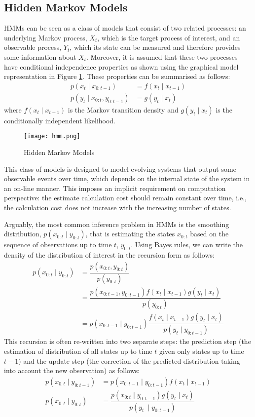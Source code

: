 \subsection{Hidden Markov Models}
HMMs can be seen as a class of models that consist of two related processes: an underlying Markov process, $X_t$, which is the target process of interest, and an observable process, $Y_t$, which its state can be measured and therefore provides some information about $X_t$. Moreover, it is assumed that these two processes have conditional independence properties as shown using the graphical model representation in Figure \ref{fig:HMM}. These properties can be summarised as follows:
\begin{align}
   p(x_t \mid x_{0:t-1}) &= f(x_t \mid x_{t-1})   \nonumber \\
   p(y_t \mid x_{0:t}, y_{0:t-1}) &= g(y_t \mid x_{t}) 
\end{align}
where $f(x_t \mid x_{t-1})$ is the Markov transition density and $g(y_t \mid x_t)$ is the conditionally independent likelihood. 

\begin{figure}[!thp]
\centering
\texttt{[image: hmm.png]} 
\caption{Hidden Markov Models}
\label{fig:HMM}
\end{figure}

This class of models is designed to model evolving systems that output some observable events over time, which depends on the internal state of the system in an on-line manner. This imposes an implicit requirement on computation perspective: the estimate calculation cost should remain constant over time, i.e., the calculation cost does not increase with the increasing number of states.

Arguably, the most common inference problem in HMMs is the smoothing distribution, $p(x_{0:t} \mid y_{0:t})$, that is estimating the states $x_{0:t}$ based on the sequence of observations up to time $t$, $y_{0:t}$. Using Bayes rules, we can write the density of the distribution of interest in the recursion form as follows:
\begin{align}
    p(x_{0:t} \mid y_{0:t}) &= \dfrac{p(x_{0:t}, y_{0:t})}{p(y_{0:t})} \nonumber \\
                            &= \dfrac{p(x_{0:t-1}, y_{0:t-1})f(x_t \mid x_{t-1}) g(y_t \mid x_t)}{p(y_{0:t})} \nonumber \\ 
                            &= p(x_{0:t-1} \mid y_{0:t-1})\dfrac{f(x_t \mid x_{t-1}) g(y_t \mid x_t)}{p(y_t \mid y_{0:t-1})} 
\end{align}
This recursion is often re-written into two separate steps: the prediction step (the estimation of distribution of all states up to time $t$ given only states up to time $t-1$) and the update step (the correction of the predicted distribution taking into account the new observation) as follows:
\begin{align}
  p(x_{0:t} \mid y_{0:t-1}) &= p(x_{0:t-1} \mid y_{0:t-1})f(x_t \mid x_{t-1}) \nonumber \\
  p(x_{0:t} \mid y_{0:t})   &= \dfrac{p(x_{0:t} \mid y_{0:t-1}) g(y_t \mid x_t)}{p(y_t\
 \mid y_{0:t-1})}
\end{align}

